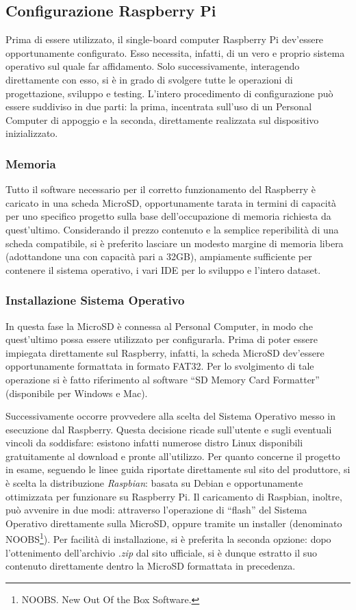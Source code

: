\documentclass[12pt]{article}
\newcommand{\quotes}[1]{``#1''}
\begin{document}
\subsection{Configurazione Raspberry Pi}
Prima di essere utilizzato, il single-board computer Raspberry Pi dev'essere opportunamente configurato. Esso necessita, infatti, di un vero e proprio sistema operativo sul quale far affidamento. Solo successivamente, interagendo direttamente con esso, si è in grado di svolgere tutte le operazioni di progettazione, sviluppo e testing. L'intero procedimento di configurazione può essere suddiviso in due parti: la prima, incentrata sull'uso di un Personal Computer di appoggio e la seconda, direttamente realizzata sul dispositivo inizializzato.

\subsubsection{Memoria}
Tutto il software necessario per il corretto funzionamento del Raspberry è caricato in una scheda MicroSD, opportunamente tarata in termini di capacità per uno specifico progetto sulla base dell'occupazione di memoria richiesta da quest'ultimo. Considerando il prezzo contenuto e la semplice reperibilità di una scheda compatibile, si è preferito lasciare un modesto margine di memoria libera (adottandone una con capacità pari a 32GB), ampiamente sufficiente per contenere il sistema operativo, i vari IDE per lo sviluppo e l'intero dataset.

\subsubsection{Installazione Sistema Operativo}
In questa fase la MicroSD è connessa al Personal Computer, in modo che quest'ultimo possa essere utilizzato per configurarla. Prima di poter essere impiegata direttamente sul Raspberry, infatti, la scheda MicroSD dev'essere opportunamente formattata in formato FAT32. Per lo svolgimento di tale operazione si è fatto riferimento al software \quotes{SD Memory Card Formatter} (disponibile per Windows e Mac).

Successivamente occorre provvedere alla scelta del Sistema Operativo messo in esecuzione dal Raspberry. Questa decisione ricade sull'utente e sugli eventuali vincoli da soddisfare: esistono infatti numerose distro Linux disponibili gratuitamente al download e pronte all'utilizzo. Per quanto concerne il progetto in esame, seguendo le linee guida riportate direttamente sul sito del produttore, si è scelta la distribuzione \textit{Raspbian}: basata su Debian e opportunamente ottimizzata per funzionare su Raspberry Pi. Il caricamento di Raspbian, inoltre, può avvenire in due modi: attraverso l'operazione di \quotes{flash} del Sistema Operativo direttamente sulla MicroSD, oppure tramite un installer (denominato NOOBS\footnote{NOOBS. New Out Of the Box Software.}). Per facilità di installazione, si è preferita la seconda opzione: dopo l'ottenimento dell'archivio \textit{.zip} dal sito ufficiale, si è dunque estratto il suo contenuto direttamente dentro la MicroSD formattata in precedenza.
\end{document}
